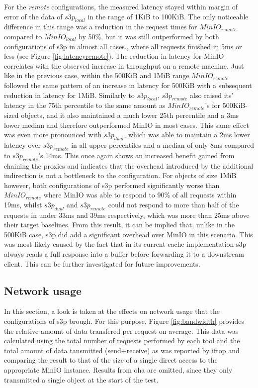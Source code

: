 For the \textit{remote} configurations, the measured latency stayed within margin of error of the data of ${s3p}_{local}$ in the range of 1KiB to 100KiB. The only noticeable difference in this range was a reduction in the request times for ${MinIO}_{remote}$ compared to ${MinIO}_{local}$ by 50\%, but it was still outperformed by both configurations of s3p in almost all cases., where all requests finished in 5ms or less (see Figure \ref{fig:latencyremote}). The reduction in latency for MinIO correlates with the observed increase in throughput on a remote machine. Just like in the previous case, within the 500KiB and 1MiB range ${MinIO}_{remote}$ followed the same pattern of an increase in latency for 500KiB with a subsequent reduction in latency for 1MiB.
Similarly to ${s3p}_{local}$, ${s3p}_{remote}$ also raised its' latency in the 75th percentile to the same amount as ${MinIO}_{remote}$'s for 500KiB-sized objects, and it also maintained a much lower 25th percentile and a 3ms lower median and therefore outperformed MinIO in most cases. This same effect was even more pronounced with ${s3p}_{dual}$, which was able to maintain a 2ms lower latency over ${s3p}_{remote}$ in all upper percentiles and a median of only 8ms compared to ${s3p}_{remote}$'s 14ms.
This once again shows an increased benefit gained from chaining the proxies and indicates that the overhead introduced by the additional indirection is not a bottleneck to the configuration.
For objects of size 1MiB however, both configurations of s3p performed significantly worse than ${MinIO}_{remote}$ where MinIO was able to respond to 90\% of all requests within 19ms, whilst ${s3p}_{dual}$ and ${s3p}_{remote}$ could not respond to more than half of the requests in under 33ms and 39ms respectively, which was more than 25ms above their target baselines.
From this result, it can be implied that, unlike in the 500KiB case, s3p did add a significant overhead over MinIO in this scenario. This was most likely caused by the fact that in its current cache implementation s3p always reads a full response into a buffer before forwarding it to a downstream client. This can be further investigated for future improvements.

\subsection{Network usage}

In this section, a look is taken at the effects on network usage that the configurations of s3p brough. For this purpose, Figure \ref{fig:bandwidth} provides the relative amount of data transfered per request on average. This data was calculated using the total number of requests performed by each tool and the total amount of data tansmitted (send+receive) as was reported by iftop and comparing the result to that of the size of a single direct access to the appropriate MinIO instance.
Results from oha are omitted, since they only transmitted a single object at the start of the test.

